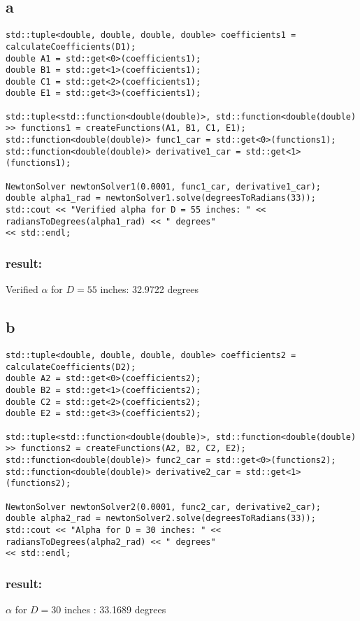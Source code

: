 \documentclass[a4paper]{article}
\begin{document}
\subsection*{a}
\begin{lstlisting}
std::tuple<double, double, double, double> coefficients1 = calculateCoefficients(D1);
double A1 = std::get<0>(coefficients1);
double B1 = std::get<1>(coefficients1);
double C1 = std::get<2>(coefficients1);
double E1 = std::get<3>(coefficients1);

std::tuple<std::function<double(double)>, std::function<double(double)
>> functions1 = createFunctions(A1, B1, C1, E1);
std::function<double(double)> func1_car = std::get<0>(functions1);
std::function<double(double)> derivative1_car = std::get<1>(functions1);

NewtonSolver newtonSolver1(0.0001, func1_car, derivative1_car);
double alpha1_rad = newtonSolver1.solve(degreesToRadians(33));
std::cout << "Verified alpha for D = 55 inches: " << radiansToDegrees(alpha1_rad) << " degrees" 
<< std::endl;
\end{lstlisting}
\subsubsection*{result:}
Verified $\alpha$ for $D = 55$ inches: 32.9722 degrees
\subsection*{b}
\begin{lstlisting}
std::tuple<double, double, double, double> coefficients2 = calculateCoefficients(D2);
double A2 = std::get<0>(coefficients2);
double B2 = std::get<1>(coefficients2);
double C2 = std::get<2>(coefficients2);
double E2 = std::get<3>(coefficients2);

std::tuple<std::function<double(double)>, std::function<double(double)
>> functions2 = createFunctions(A2, B2, C2, E2);
std::function<double(double)> func2_car = std::get<0>(functions2);
std::function<double(double)> derivative2_car = std::get<1>(functions2);

NewtonSolver newtonSolver2(0.0001, func2_car, derivative2_car);
double alpha2_rad = newtonSolver2.solve(degreesToRadians(33));
std::cout << "Alpha for D = 30 inches: " << radiansToDegrees(alpha2_rad) << " degrees"
<< std::endl;
\end{lstlisting}
\subsubsection*{result:}
$\alpha$ for $D = 30$ inches : 33.1689 degrees
\end{document}
